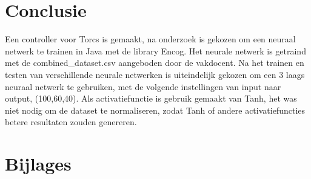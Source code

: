 \documentclass{article}
\begin{document}
\section{Conclusie}
Een controller voor Torcs is gemaakt, na onderzoek is gekozen om een neuraal netwerk te trainen in Java met de library Encog. Het neurale netwerk is getraind met de combined\_dataset.csv aangeboden door de vakdocent. Na het trainen en testen van verschillende neurale netwerken is uiteindelijk gekozen om een 3 laags neuraal netwerk te gebruiken, met de volgende instellingen van input naar output, (100,60,40). Als activatiefunctie is gebruik gemaakt van Tanh, het was niet nodig om de dataset te normaliseren, zodat Tanh of andere activatiefuncties betere resultaten zouden genereren.
\pagebreak
\section{Bijlages}
\end{document}
